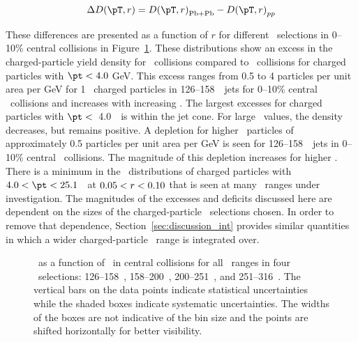 \begin{align*}
\DeltaDptr = \Dptr_{\mathrm{Pb+Pb}} - \Dptr_{pp}
\end{align*}

These differences are presented as a function of $r$ for different \pt\ selections in 0--10\% central collisions in Figure~\ref{fig:deltadptr}. 
These distributions show an excess  in the charged-particle yield density for \pbpb\ collisions compared to \pp\ collisions for charged particles with $\pt <4.0$ GeV. This excess ranges from 0.5 to 4 particles per unit area per GeV for 1 \GeV\ charged particles in 126--158~\GeV\ jets for 0--10\% central \pbpb\ collisions and increases with increasing \ptjet. 
The largest excesses for charged particles with $\pt <$~4.0~\GeV\ is within the jet cone.  For large \rvar\ values, the
density decreases, but remains positive.
A depletion for higher \pt\ particles of approximately 0.5 particles per unit area per GeV is seen for 126--158~\GeV\ jets in 0--10\% central \pbpb\ collisions. The magnitude of this depletion increases for higher \ptjet. 
There is a minimum in the \DeltaDptr\ distributions of charged 
particles with \mbox{$ 4.0 < \pt <  25.1$}~\GeV\ at $0.05 < \mbox{$r$} < 0.10$ that is seen at many \ptjet\ ranges under investigation.
The magnitudes of the excesses and deficits discussed here are dependent on the sizes of the charged-particle \pt\ selections
chosen.  In order to remove that dependence, Section~\ref{sec:discussion_int} provides similar quantities in which a
wider charged-particle \pt\ range is integrated over.

\begin{figure}
   \caption{\DeltaDptr\ as a function of \rvar\ in central collisions for all \pt\ ranges in four \ptjet\ selections: 126--158~\GeV, 158--200~\GeV, 200--251~\GeV, and 251--316~\GeV. The vertical bars on the data points indicate statistical uncertainties while the shaded boxes indicate systematic uncertainties. The widths of the boxes are not indicative of the bin size and the points are shifted horizontally for better visibility. }
      \label{fig:deltadptr}
\end{figure}
\FloatBarrier


